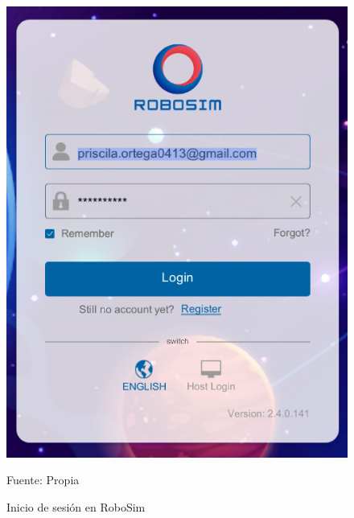 \begin{figure}[H]
    \centering
    \includegraphics[scale = 0.60]{Imagenes/login.png}
    \caption{Inicio de sesión en RoboSim}{Fuente: Propia}
\end{figure}


